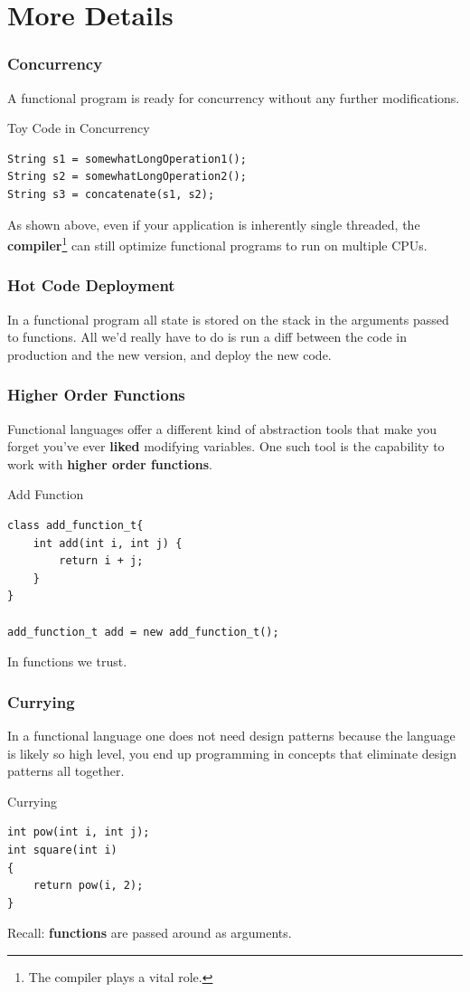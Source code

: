 \documentclass[12pt,hyperref=true,mathserif]{beamer}
\begin{document}
\section{More Details}


\begin{frame}
  \frametitle{Concurrency}
A functional program is ready for concurrency without any further
modifications.
\begin{block}{Toy Code in Concurrency}
\begin{verbatim}
String s1 = somewhatLongOperation1();
String s2 = somewhatLongOperation2();
String s3 = concatenate(s1, s2);
\end{verbatim}
\end{block}
As shown above, even if your application is inherently single
threaded, the \textbf{compiler}\footnote{The compiler plays a vital
  role.} can still optimize functional programs to run on multiple CPUs.
\end{frame}

\begin{frame}
  \frametitle{Hot Code Deployment}
In a functional program all state is stored on the stack in the
arguments passed to functions. All we'd really have to do is run a
diff between the code in production and the new version, and deploy
the new code.

\end{frame}

\begin{frame}
  \frametitle{Higher Order Functions}
Functional languages offer a different kind of abstraction tools that
make you forget you've ever \textbf{liked} modifying variables. One such
tool is the capability to work with \textbf{higher order
  functions}.
\begin{block}{Add Function}
\begin{verbatim}
class add_function_t{
    int add(int i, int j) {
        return i + j;
    }
}

add_function_t add = new add_function_t();
\end{verbatim}
\end{block}
In functions we trust.
\end{frame}

\begin{frame}
  \frametitle{Currying}
In a functional language one does not need design patterns because the
language is likely so high level, you end up programming in concepts
that eliminate design patterns all together.
\begin{block}{Currying}
\begin{verbatim}
int pow(int i, int j);
int square(int i)
{
    return pow(i, 2);
}
\end{verbatim}
\end{block}
Recall: \textbf{functions} are passed around as arguments.
\end{frame}
\end{document}
